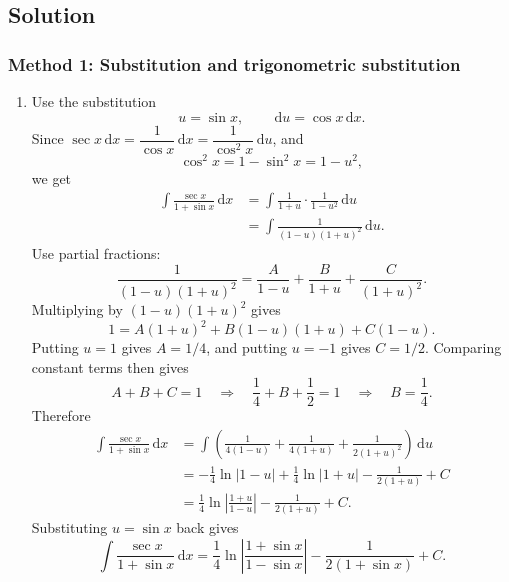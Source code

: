 \documentclass[12pt]{article}
\newcommand{\dd}{\,\mathrm{d}}
\newcommand{\abs}[1]{\left|#1\right|}
\begin{document}
\newpage
\subsection{Solution}

\subsubsection{Method 1: Substitution and trigonometric substitution}

\begin{enumerate}[label=(\alph*)]
\item Use the substitution
\[
u=\sin x,
\qquad \dd u=\cos x\dd x.
\]
Since $\sec x\dd x=\dfrac{1}{\cos x}\dd x=\dfrac{1}{\cos^2 x}\dd u$, and
\[
\cos^2 x=1-\sin^2x=1-u^2,
\]
we get
\begin{align*}
\int \frac{\sec x}{1+\sin x}\dd x
&=\int \frac{1}{1+u}\cdot \frac{1}{1-u^2}\dd u \\
&=\int \frac{1}{(1-u)(1+u)^2}\dd u.
\end{align*}
Use partial fractions:
\[
\frac{1}{(1-u)(1+u)^2}
=\frac{A}{1-u}+\frac{B}{1+u}+\frac{C}{(1+u)^2}.
\]
Multiplying by $(1-u)(1+u)^2$ gives
\[
1=A(1+u)^2+B(1-u)(1+u)+C(1-u).
\]
Putting $u=1$ gives $A=1/4$, and putting $u=-1$ gives $C=1/2$. Comparing constant terms then gives
\[
A+B+C=1
\quad\Longrightarrow\quad
\frac14+B+\frac12=1
\quad\Longrightarrow\quad
B=\frac14.
\]
Therefore
\begin{align*}
\int \frac{\sec x}{1+\sin x}\dd x
&=\int \left(\frac{1}{4(1-u)}+\frac{1}{4(1+u)}+\frac{1}{2(1+u)^2}\right)\dd u \\
&=-\frac14\ln\abs{1-u}+\frac14\ln\abs{1+u}-\frac{1}{2(1+u)}+C \\
&=\frac14\ln\abs{\frac{1+u}{1-u}}-\frac{1}{2(1+u)}+C.
\end{align*}
Substituting $u=\sin x$ back gives
\[
\boxed{\displaystyle
\int \frac{\sec x}{1+\sin x}\dd x
=\frac14\ln\abs{\frac{1+\sin x}{1-\sin x}}-\frac{1}{2(1+\sin x)}+C.}
\]


\end{enumerate}
\end{document}
